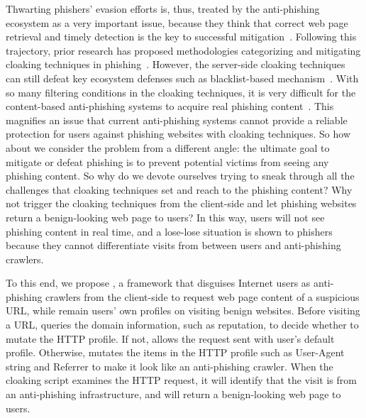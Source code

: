 Thwarting phishers' evasion efforts is, thus, treated by the anti-phishing ecosystem as a very important issue,
because they think that correct web page retrieval and timely detection is the key to successful mitigation~\cite{oest2020sunrise, zhang2021crawlphish}.
Following this trajectory, prior research has proposed methodologies categorizing and mitigating cloaking techniques in phishing~\cite{oest2018inside, oest2019phishfarm, zhang2021crawlphish}.
However, the server-side cloaking techniques can still defeat key ecosystem defenses such as blacklist-based mechanism~\cite{oest2019phishfarm}.
With so many filtering conditions in the cloaking techniques,
it is very difficult for the content-based anti-phishing systems to acquire real phishing content~\cite{oest2018inside, oest2020phishtime}.
This magnifies an issue that current anti-phishing systems cannot provide a reliable protection for users against phishing websites with cloaking techniques.
So how about we consider the problem from a different angle:
the ultimate goal to mitigate or defeat phishing is to prevent potential victims from seeing any phishing content.
So why do we devote ourselves trying to sneak through all the challenges that cloaking techniques set and reach to the phishing content?
Why not trigger the cloaking techniques from the client-side and let phishing websites return a benign-looking web page to users?
In this way, users will not see phishing content in real time, and a lose-lose situation is shown to phishers because they cannot differentiate visits from between users and anti-phishing crawlers.

To this end, we propose \spartacus, a framework that disguises Internet users as anti-phishing crawlers from the client-side to request web page content of a suspicious URL, while remain users' own profiles on visiting benign websites.
Before visiting a URL, \spartacus queries the domain information, such as reputation, to decide whether to mutate the HTTP profile.
If not, \spartacus allows the request sent with user's default profile.
Otherwise, \spartacus mutates the items in the HTTP profile such as User-Agent string and Referrer to make it look like an anti-phishing crawler.
When the cloaking script examines the HTTP request, it will identify that the visit is from an anti-phishing infrastructure, and will return a benign-looking web page to users.

